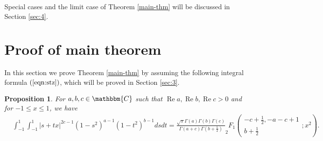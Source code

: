 \documentclass{article}
\numberwithin{equation}{section}
\newcommand{\tmop}[1]{\ensuremath{\operatorname{#1}}}
\newtheorem{proposition}[corollary]{Proposition}
{\theorembodyfont{\rmfamily}\newtheorem{remark}[corollary]{Remark}}
\begin{document}
Special cases and the limit case of Theorem \ref{main-thm} will be discussed
in Section \ref{sec:4}.

\section{Proof of main theorem}\label{sec:2}

In this section we prove Theorem \ref{main-thm} by assuming the following
integral formula $(\ref{eqn:stz})$, which will be proved in Section
\ref{sec:3}.

\begin{proposition}
  \label{prop:2}For $a, b, c \in \mathbbm{C}$ such that $\tmop{Re} a,
  \tmop{Re} b, \tmop{Re} c > 0$ and for $- 1 \leqslant x \leqslant 1$, we have
  \begin{eqnarray}
    & \displaystyle\int_{- 1}^1 \displaystyle\int_{- 1}^1 | s + t x |^{2 c - 1} (1 - s^2)^{a - 1} (1 -
    t^2)^{b - 1} d s d t = \frac{\sqrt{\pi} \Gamma (a) \Gamma (b) \Gamma
    (c)}{\Gamma (a + c) \Gamma \left( b + \frac{1}{2} \right)} _2 F_1 \left(
    \begin{array}{c}
      - c + \frac{1}{2}, - a - c + 1\\
      b + \frac{1}{2}
    \end{array} ; x^2 \right) .  \label{eqn:stz} & \\
    &  &  \nonumber
  \end{eqnarray}
\end{proposition}
\end{document}
